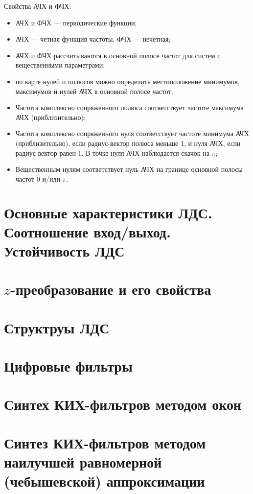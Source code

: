 \documentclass[a4paper, 14pt]{extarticle}
\begin{document}
Свойства АЧХ и ФЧХ:
\begin{itemize}
    \item АЧХ и ФЧХ --- периодические функции;
    \item АЧХ --- четная функция частоты, ФЧХ --- нечетная;
    \item АЧХ и ФЧХ рассчитываются в основной полосе частот для систем с вещественными параметрами;
    \item по карте нулей и полюсов можно определить местоположение минимумов, максимумов и нулей АЧХ в основной полосе частот;
    \item Частота комплексно сопряженного полюса соответствует частоте максимума АЧХ (приблизительно);
    \item Частота комплексно сопряженного нуля соответствует частоте минимума АЧХ (приблизительно), если радиус-вектор полюса меньше 1, и нуля АЧХ, если радиус-вектор равен 1. В точке нуля АЧХ наблюдается скачок на $\pi$;
    \item Вещественным нулям соответствует нуль АЧХ на границе основной полосы частот $0$ и/или $\pi$.
\end{itemize}

\section{Основные характеристики ЛДС. Соотношение вход/выход. Устойчивость ЛДС}
\lipsum[1] %

\section{$z$-преобразование и его свойства}
\lipsum[1] %

\section{Структруы ЛДС}
\lipsum[1] %

\section{Цифровые фильтры}
\lipsum[1] %

\section{Синтех КИХ-фильтров методом окон}
\lipsum[1] %

\section{Синтез КИХ-фильтров методом наилучшей равномерной (чебышевской) аппроксимации}
\lipsum[1] %
\end{document}
